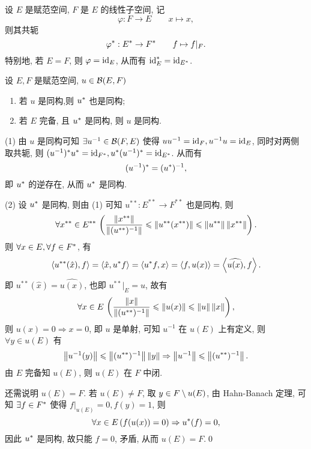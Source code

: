 	\begin{Example}
		设 $ E $ 是赋范空间,  $ F $ 是 $ E $ 的线性子空间, 记
		\[
			\varphi: F\to E\qquad x\mapsto x,
		\]
		则其共轭
		\[
			\varphi^{*}: E^{*}\to F^{*}\qquad f\mapsto f|_{F}.
		\]
		特别地, 若 $ E=F $, 则 $ \varphi=\mathrm{id}_{E} $, 从而有 $ \mathrm{id}_{E}^{*}=\mathrm{id}_{E^{*}} $.
	\end{Example}	
	\begin{Theorem}
		设 $ E, F $ 是赋范空间, $ u\in\mathcal{B}(E, F) $
		\begin{enumerate}[(1)]
			\item 若 $ u $ 是同构,则 $ u^{*} $ 也是同构;
			\item 若 $ E $ 完备, 且 $ u^{*} $ 是同构, 则 $ u $ 是同构.
		\end{enumerate}
	\end{Theorem}
	\begin{Proof}
		(1) 由 $ u $ 是同构可知 $ \exists u^{-1}\in\mathcal{B}(F, E) $ 使得 $ uu^{-1}=\mathrm{id}_{F}, u^{-1}u=\mathrm{id}_{E} $, 同时对两侧取共轭, 则 $ (u^{-1})^{*}u^{*}=\mathrm{id}_{F^{*}},u^{*}(u^{-1})^{*}=\mathrm{id}_{E^{*}}  $. 从而有
		\[
			(u^{-1})^{*}=(u^{*})^{-1},
		\]
		即 $ u^{*} $ 的逆存在, 从而 $ u^{*} $ 是同构.

		(2) 设 $ u^{*} $ 是同构, 则由 (1) 可知 $ u^{**}: E^{**}\to F^{**} $ 也是同构, 则
		\[
			\forall x^{**}\in E^{**}\,\left(\frac{\left\| x^{**} \right\|}{\left\| (u^{**})^{-1} \right\|}\leqslant\left\| u^{**}(x^{**}) \right\|\leqslant\left\| u^{**} \right\|\left\| x^{**} \right\|\right).
		\]
		则 $ \forall x\in E, \forall f\in F^{*} $, 有
		\[
			\left\langle u^{**}(\hat{x}), f \right\rangle=\left\langle \hat{x}, u^{*}f \right\rangle=\left\langle u^{*}f, x \right\rangle=\left\langle f, u(x) \right\rangle=\left\langle \widehat{u(x)}, f \right\rangle.
		\]
		即 $ u^{**}(\hat{x})=\widehat{u(x)} $, 也即 $ u^{**}|_{E}=u $, 故有
		\[
			\forall x\in E\,\left( \frac{\left\| x \right\|}{\left\| (u^{**})^{-1} \right\|}\leqslant\left\| u(x) \right\|\leqslant\left\| u \right\|\left\| x \right\| \right),
		\]
		则 $ u(x)=0\Longrightarrow x=0 $, 即 $ u $ 是单射, 可知 $ u^{-1} $ 在 $ u(E) $ 上有定义, 则 $ \forall y\in u(E) $ 有
		\[
			\left\| u^{-1}(y) \right\|\leqslant\left\| (u^{**})^{-1} \right\|\left\| y \right\|\Rightarrow \left\| u^{-1} \right\|\leqslant\left\| (u^{**})^{-1} \right\|.
		\]
		由 $ E $ 完备知 $ u(E) $, 则 $ u(E) $ 在 $ F $ 中闭.

		还需说明 $ u(E)=F $. 若 $ u(E)\ne F $, 取 $ y\in F\setminus u(E) $, 由 Hahn-Banach 定理, 可知 $ \exists f\in F^{*} $ 使得 $ f|_{u(E)}=0, f(y)=1 $, 则
		\[
			\forall x\in E\,(f(u(x))=0)\Rightarrow u^{*}(f)=0,
		\]
		因此 $ u^{*} $ 是同构, 故只能 $ f=0 $, 矛盾, 从而 $ u(E)=F $.\qed
	\end{Proof}

